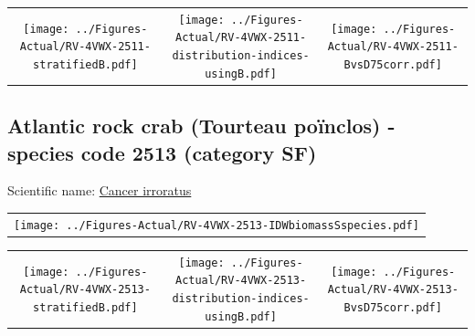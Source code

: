\documentclass[12pt]{article}\usepackage[]{graphicx}\usepackage[]{color}
\begin{document}
\vspace{1cm}
\begin{minipage}{1.0\textwidth}
 \begin{tabular}{ccc}
\texttt{[image: ../Figures-Actual/RV-4VWX-2511-stratifiedB.pdf]} & 
\texttt{[image: ../Figures-Actual/RV-4VWX-2511-distribution-indices-usingB.pdf]} & 
\texttt{[image: ../Figures-Actual/RV-4VWX-2511-BvsD75corr.pdf]} \\ 
\end{tabular} 
\end{minipage}
\clearpage

\renewcommand\thefigure{\thesubsection\Alph{figure}}

\setcounter{figure}{0}

\hypertarget{sec:2513}{%
\subsection{Atlantic rock crab (Tourteau poïnclos) - species code 2513 (category SF)}\label{sec:2513}}

  


Scientific name: \href{http://www.marinespecies.org/aphia.php?p=taxdetails\&id=158057}{Cancer irroratus} \newline
\begin{minipage}{1.0\textwidth}
 \begin{tabular}{c}
\texttt{[image: ../Figures-Actual/RV-4VWX-2513-IDWbiomassSspecies.pdf]} \\ 
\end{tabular} 
\end{minipage}
\newline

\vspace{1cm}
\begin{minipage}{1.0\textwidth}
 \begin{tabular}{ccc}
\texttt{[image: ../Figures-Actual/RV-4VWX-2513-stratifiedB.pdf]} & 
\texttt{[image: ../Figures-Actual/RV-4VWX-2513-distribution-indices-usingB.pdf]} & 
\texttt{[image: ../Figures-Actual/RV-4VWX-2513-BvsD75corr.pdf]} \\ 
\end{tabular} 
\end{minipage}
\clearpage
\end{document}
